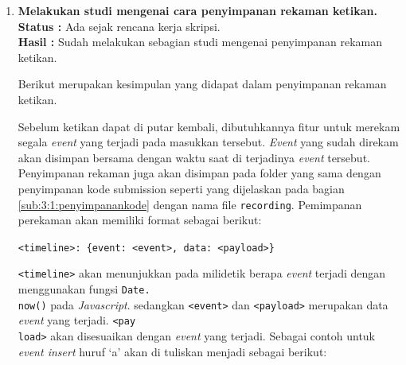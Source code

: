 \documentclass[a4paper,twoside]{article}
\begin{document}
\begin{enumerate}
	      \begin{lstlisting}[language={php}, caption={Contoh template Twig}, label={kode:2:twig}]
{% extends "base.html" %}
{% block navigation %}
	<ul id="navigation">
	{% for item in navigation %}
		<li>
			<a href="{{item.href}}">
				{% if item.level == 2 %}&nbsp;&nbsp;{% endif %}
				{{ item.caption|upper }}
			</a>
		</li>
	{% endfor %}
	</ul>
{% endblock navigation %}
			\end{lstlisting}

	      Kode \ref{kode:2:twig} merupakan contoh sebuah template Twig. Terdapat dua jenis \textit{delimiter}, yaitu \verb|{% ... %}| dan \verb|{{ ... }}|. \textit{Delimiter} \verb|{% ... %}| digunakan untuk Menjalankan sebuah \textit{statement} seperti \textit{for-loops}, sedangkan \textit{delimiter} \verb|{{ ... }}| digunakan untuk mengubah sebuah \textit{variable} atau \textit{expression} menjadi nilai sesungguhnya.


	\item \textbf{Melakukan studi mengenai cara penyimpanan rekaman ketikan.} \\
	      {\bf Status :} Ada sejak rencana kerja skripsi.\\
	      {\bf Hasil :} Sudah melakukan sebagian studi mengenai penyimpanan rekaman ketikan.

	      Berikut merupakan kesimpulan yang didapat dalam penyimpanan rekaman ketikan.

	      Sebelum ketikan dapat di putar kembali, dibutuhkannya fitur untuk merekam segala \textit{event} yang terjadi pada masukkan tersebut. \textit{Event} yang sudah direkam akan disimpan bersama dengan waktu saat di terjadinya \textit{event} tersebut. Penyimpanan rekaman juga akan disimpan pada folder yang sama dengan penyimpanan kode submission seperti yang dijelaskan pada bagian \ref{sub:3:1:penyimpanankode} dengan nama file \verb|recording|. Pemimpanan perekaman akan memiliki format sebagai berikut:

	      \begin{center}
		      \verb|<timeline>: {event: <event>, data: <payload>}|
	      \end{center}

	      \verb|<timeline>| akan menunjukkan pada milidetik berapa \textit{event} terjadi dengan menggunakan fungsi \verb|Date.| \\ \verb|now()| pada \textit{Javascript}. sedangkan \verb|<event>| dan \verb|<payload>| merupakan data \textit{event} yang terjadi. \verb|<pay| \\ \verb|load>| akan disesuaikan dengan \textit{event} yang terjadi. Sebagai contoh untuk \textit{event insert} huruf `a' akan di tuliskan menjadi sebagai berikut:


\end{enumerate}
\end{document}
